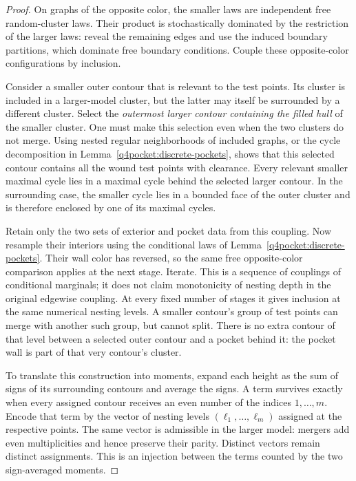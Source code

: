 \begin{proof}
On graphs of the opposite color, the smaller laws are independent free
random-cluster laws.  Their product is stochastically dominated by the
restriction of the larger laws: reveal the remaining edges and use
the induced boundary partitions, which dominate free boundary
conditions.  Couple these opposite-color configurations by inclusion.

Consider a smaller outer contour that is relevant to the test points.
Its cluster is included in a larger-model cluster, but the latter may
itself be surrounded by a different cluster.  Select the \emph{outermost
larger contour containing the filled hull} of the smaller cluster.
One must make this selection even when the two clusters do not merge.
Using nested regular neighborhoods of included graphs, or the
cycle decomposition in Lemma~\ref{q4pocket:discrete-pockets}, shows
that this selected contour contains all the wound test points with
clearance.  Every relevant smaller maximal cycle lies in a maximal
cycle behind the selected larger contour.  In the surrounding case,
the smaller cycle lies in a bounded face of the outer cluster and is
therefore enclosed by one of its maximal cycles.

Retain only the two sets of exterior and pocket data from this
coupling.  Now resample their interiors using the conditional laws
of Lemma~\ref{q4pocket:discrete-pockets}.  Their wall color has reversed,
so the same free opposite-color comparison applies at the next stage.
Iterate.  This is a sequence of couplings of conditional marginals;
it does not claim monotonicity of nesting depth in the original
edgewise coupling.  At every fixed number of stages it gives inclusion
at the same numerical nesting levels.  A smaller contour's group of
test points can merge with another such group, but cannot split.
There is no extra contour of that level between a selected outer
contour and a pocket behind it: the pocket wall is part of that very
contour's cluster.

To translate this construction into moments, expand each height as
the sum of signs of its surrounding contours and average the signs.
A term survives exactly when every assigned contour receives an even
number of the indices $1,\ldots,m$.  Encode that term by the vector of
nesting levels $(\ell_1,\ldots,\ell_m)$ assigned at the respective
points.  The same vector is admissible in the larger model: mergers
add even multiplicities and hence preserve their parity.  Distinct
vectors remain distinct assignments.  This is an injection between
the terms counted by the two sign-averaged moments.


\end{proof}
